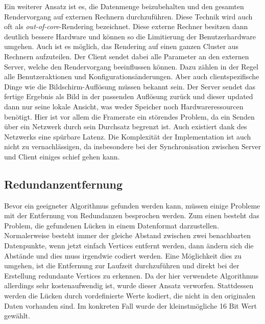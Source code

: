 Ein weiterer Ansatz ist es, die Datenmenge beizubehalten und den gesamten Rendervorgang auf externen Rechnern durchzuführen. Diese Technik wird auch oft als \textit{out-of-core}-Rendering bezeichnet\cite[Abschnitt 3]{outOfCore}. Diese externe Rechner besitzen dann deutlich bessere Hardware und können so die Limitierung der Benutzerhardware umgehen. Auch ist es möglich, das Rendering auf einen ganzen Cluster aus Rechnern aufzuteilen.  Der Client sendet dabei alle Parameter an den externen Server, welche den Rendervorgang beeinflussen können. Dazu zählen in der Regel alle Benutzeraktionen und Konfigurationsänderungen. Aber auch clientspezifische Dinge wie die Bildschirm-Auflösung müssen bekannt sein. Der Server sendet das fertige Ergebnis als Bild in der passenden Auflösung zurück und dieser updated dann nur seine lokale Ansicht, was weder Speicher noch Hardwareressourcen benötigt. Hier ist vor allem die Framerate ein störendes Problem, da ein Senden über ein Netzwerk durch sein Durchsatz begrenzt ist. Auch existiert dank des Netzwerks eine spürbare Latenz. Die Komplexität der Implementation ist auch nicht zu vernachlässigen, da insbesondere bei der Synchronisation zwischen Server und Client einiges schief gehen kann.

\subsection{Redundanzentfernung}\label{redundanzberechnung}
Bevor ein geeigneter Algorithmus gefunden werden kann, müssen einige Probleme mit der Entfernung von Redundanzen besprochen werden. Zum einen besteht das Problem, die gefundenen Lücken in einem Datenformat darzustellen. Normalerweise besteht immer der gleiche Abstand zwischen zwei benachbarten Datenpunkte, wenn jetzt einfach Vertices entfernt werden, dann ändern sich die Abstände und dies muss irgendwie codiert werden. Eine Möglichkeit dies zu umgehen, ist die Entfernung zur Laufzeit durchzuführen und direkt bei der Erstellung redundante Vertices zu erkennen. Da der hier verwendete Algorithmus allerdings sehr kostenaufwendig ist, wurde dieser Ansatz verworfen. Stattdessen werden die Lücken durch vordefinierte Werte kodiert, die nicht in den originalen Daten vorhanden sind. Im konkreten Fall wurde der kleinstmögliche 16 Bit Wert gewählt. 

